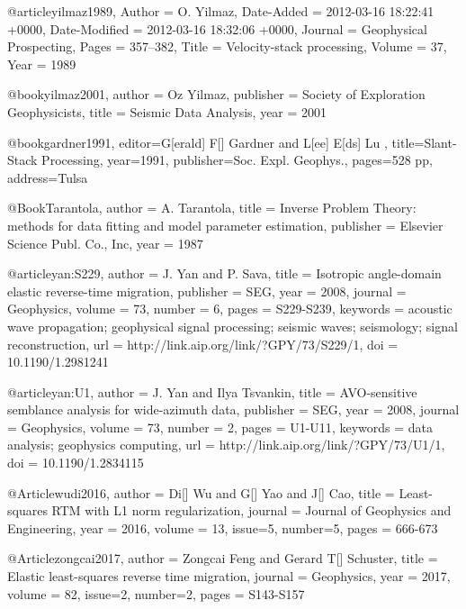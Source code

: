 @article{yilmaz1989,
	Author = {O. Yilmaz},
	Date-Added = {2012-03-16 18:22:41 +0000},
	Date-Modified = {2012-03-16 18:32:06 +0000},
	Journal = {Geophysical Prospecting},
	Pages = {357--382},
	Title = {Velocity-stack processing},
	Volume = {37},
	Year = {1989}}

@book{yilmaz2001,
   author = {Oz Yilmaz},
   publisher = {Society of Exploration Geophysicists},
   title = {Seismic Data Analysis},
   year = {2001}
}

@book{gardner1991,
  editor={G[erald] F[]  Gardner  and L[ee] E[ds]  Lu },
  title={Slant-Stack Processing},
  year=1991,
  publisher={Soc. Expl. Geophys.},
  pages={528 pp},
  address={Tulsa}
}



@Book{Tarantola,
  author = 	 {A. Tarantola},
  title = 	 {Inverse {P}roblem {T}heory: methods for data
                 fitting and model parameter estimation},
  publisher = 	 {Elsevier Science Publ. Co., Inc},
  year = 	 1987
}

@article{yan:S229,
  author =	 {J. Yan and P. Sava},
  title =	 {Isotropic angle-domain elastic reverse-time
                  migration},
  publisher =	 {SEG},
  year =	 2008,
  journal =	 {Geophysics},
  volume =	 73,
  number =	 6,
  pages =	 {S229-S239},
  keywords =	 {acoustic wave propagation; geophysical signal
                  processing; seismic waves; seismology; signal
                  reconstruction},
  url =		 {http://link.aip.org/link/?GPY/73/S229/1},
  doi =		 {10.1190/1.2981241}
}

@article{yan:U1,
  author =	 {J. Yan and Ilya Tsvankin},
  title =	 {AVO-sensitive semblance analysis for wide-azimuth
                  data},
  publisher =	 {SEG},
  year =	 2008,
  journal =	 {Geophysics},
  volume =	 73,
  number =	 2,
  pages =	 {U1-U11},
  keywords =	 {data analysis; geophysics computing},
  url =		 {http://link.aip.org/link/?GPY/73/U1/1},
  doi =		 {10.1190/1.2834115}
}



@Article{wudi2016,
  author = 	 {Di[] Wu and G[] Yao and J[] Cao},
  title = 	 {Least-squares RTM with {L}1 norm regularization},
  journal = 	 {Journal of Geophysics and Engineering},
  year = 	 2016,
  volume = 	 13,
  issue=5,
  number=5,
  pages = 	 {666-673}}
  

@Article{zongcai2017,
  author = 	 {Zongcai Feng and Gerard T[] Schuster},
  title = 	 {Elastic least-squares reverse time migration},
  journal = 	 {Geophysics},
  year = 	 2017,
  volume = 	 82,
  issue=2,
  number=2,
  pages = 	 {S143-S157}}
  

